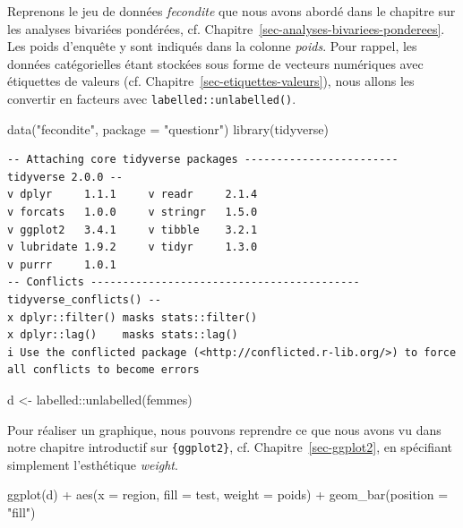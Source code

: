 \documentclass[
  letterpaper,
  DIV=11,
  numbers=noendperiod,
  oneside]{scrreprt}
\newenvironment{Shaded}{\begin{snugshade}}{\end{snugshade}}
\newcommand{\AttributeTok}[1]{\textcolor[rgb]{0.40,0.45,0.13}{#1}}
\newcommand{\FunctionTok}[1]{\textcolor[rgb]{0.28,0.35,0.67}{#1}}
\newcommand{\NormalTok}[1]{\textcolor[rgb]{0.00,0.23,0.31}{#1}}
\newcommand{\OtherTok}[1]{\textcolor[rgb]{0.00,0.23,0.31}{#1}}
\newcommand{\SpecialCharTok}[1]{\textcolor[rgb]{0.37,0.37,0.37}{#1}}
\newcommand{\StringTok}[1]{\textcolor[rgb]{0.13,0.47,0.30}{#1}}
\begin{document}
Reprenons le jeu de données \emph{fecondite} que nous avons abordé dans
le chapitre sur les analyses bivariées pondérées, cf.
Chapitre~\ref{sec-analyses-bivariees-ponderees}. Les poids d'enquête y
sont indiqués dans la colonne \emph{poids}. Pour rappel, les données
catégorielles étant stockées sous forme de vecteurs numériques avec
étiquettes de valeurs (cf. Chapitre~\ref{sec-etiquettes-valeurs}), nous
allons les convertir en facteurs avec \texttt{labelled::unlabelled()}.

\begin{Shaded}
\begin{Highlighting}[]
\FunctionTok{data}\NormalTok{(}\StringTok{"fecondite"}\NormalTok{, }\AttributeTok{package =} \StringTok{"questionr"}\NormalTok{)}
\FunctionTok{library}\NormalTok{(tidyverse)}
\end{Highlighting}
\end{Shaded}

\begin{verbatim}
-- Attaching core tidyverse packages ------------------------ tidyverse 2.0.0 --
v dplyr     1.1.1     v readr     2.1.4
v forcats   1.0.0     v stringr   1.5.0
v ggplot2   3.4.1     v tibble    3.2.1
v lubridate 1.9.2     v tidyr     1.3.0
v purrr     1.0.1     
-- Conflicts ------------------------------------------ tidyverse_conflicts() --
x dplyr::filter() masks stats::filter()
x dplyr::lag()    masks stats::lag()
i Use the conflicted package (<http://conflicted.r-lib.org/>) to force all conflicts to become errors
\end{verbatim}

\begin{Shaded}
\begin{Highlighting}[]
\NormalTok{d }\OtherTok{\textless{}{-}}\NormalTok{ labelled}\SpecialCharTok{::}\FunctionTok{unlabelled}\NormalTok{(femmes)}
\end{Highlighting}
\end{Shaded}

Pour réaliser un graphique, nous pouvons reprendre ce que nous avons vu
dans notre chapitre introductif sur \texttt{\{ggplot2\}}, cf.
Chapitre~\ref{sec-ggplot2}, en spécifiant simplement l'esthétique
\emph{weight}.

\begin{Shaded}
\begin{Highlighting}[]
\FunctionTok{ggplot}\NormalTok{(d) }\SpecialCharTok{+}
  \FunctionTok{aes}\NormalTok{(}\AttributeTok{x =}\NormalTok{ region, }\AttributeTok{fill =}\NormalTok{ test, }\AttributeTok{weight =}\NormalTok{ poids) }\SpecialCharTok{+}
  \FunctionTok{geom\_bar}\NormalTok{(}\AttributeTok{position =} \StringTok{"fill"}\NormalTok{)}
\end{Highlighting}
\end{Shaded}
\end{document}
